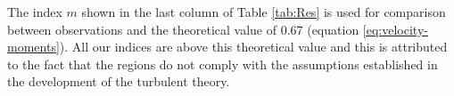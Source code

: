 







The index \(m\) shown in the last column of Table \ref{tab:Res} is used for comparison between observations and the theoretical value of 0.67 (equation \ref{eq:velocity-moments}).
All our indices are above this theoretical value and this is attributed to the fact that the \hii{} regions do not comply with the assumptions established in the development of the turbulent theory.

